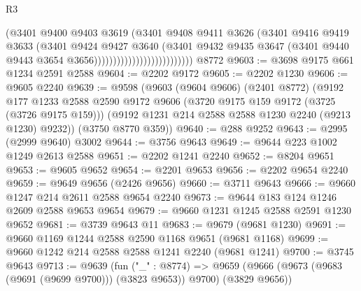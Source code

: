 \begin{lexlean}{R3}
\begin{coremodule}
                                            (@3401
                                              @9400
                                              @9403
                                              @3619
                                              (@3401
                                                @9408
                                                @9411
                                                @3626
                                                (@3401
                                                  @9416
                                                  @9419
                                                  @3633
                                                  (@3401
                                                    @9424
                                                    @9427
                                                    @3640
                                                    (@3401
                                                      @9432
                                                      @9435
                                                      @3647
                                                      (@3401
                                                        @9440
                                                        @9443
                                                        @3654
                                                        @3656))))))))))))))))))))))))))
    @8772
@9603 := @3698 @9175 @661 @1234 @2591 @2588
@9604 := @2202 @9172
@9605 := @2202 @1230
@9606 := @9605 @2240
@9639 := @9598
    (@9603
      (@9604 @9606)
      (@2401 @8772)
      (@9192
        @177
        @1233
        @2588
        @2590
        @9172
        @9606
        (@3720 @9175 @159 @9172 (@3725 (@3726 @9175 @159)))
        (@9192 @1231 @214 @2588 @2588 @1230 @2240 (@9213 @1230) @9232))
      (@3750 @8770 @359))
@9640 := @288 @9252
@9643 := @2995 (@2999 @9640) @3002
@9644 := @3756 @9643
@9649 := @9644 @223 @1002 @1249 @2613 @2588
@9651 := @2202 @1241 @2240
@9652 := @8204 @9651
@9653 := @9605 @9652
@9654 := @2201 @9653
@9656 := @2202 @9654 @2240
@9659 := @9649 @9656 (@2426 @9656)
@9660 := @3711 @9643
@9666 := @9660 @1247 @214 @2611 @2588 @9654 @2240
@9673 := @9644 @183 @124 @1246 @2609 @2588 @9653 @9654
@9679 := @9660 @1231 @1245 @2588 @2591 @1230 @9652
@9681 := @3739 @9643 @11
@9683 := @9679 (@9681 @1230)
@9691 := @9660 @1169 @1244 @2588 @2590 @1168 @9651 (@9681 @1168)
@9699 := @9660 @1242 @214 @2588 @2588 @1241 @2240 (@9681 @1241)
@9700 := @3745 @9643
@9713 := @9639
    (fun ("_" : @8774) =>
    @9659 (@9666 (@9673 (@9683 (@9691 (@9699 @9700))) (@3823 @9653)) @9700) (@3829 @9656))

\end{coremodule}
\end{lexlean}
